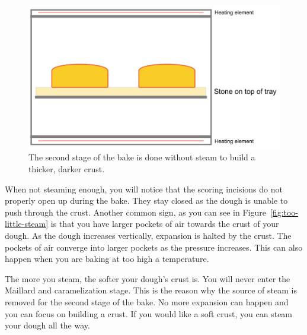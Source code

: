 \begin{figure}[!htb]
  \includegraphics[width=\textwidth]{baking-process-stage-2.jpg}
  \caption[Baking step~2, without steam]{The second stage of the bake is done
      without steam to build a thicker, darker crust.}
\end{figure}

When not steaming enough, you will notice that the scoring
incisions do not properly open up during the bake. They stay
closed as the dough is unable to push through the crust.
Another common sign, as you can see in Figure~\ref{fig:too-little-steam} is
that you have larger pockets of air towards the crust of your dough. As the
dough increases vertically, expansion is halted by the crust. The pockets
of air converge into larger pockets as the pressure increases.
This can also happen when you are baking at too high a temperature.

The more you steam, the softer your dough's crust is. You will never
enter the Maillard and caramelization stage. This
is the reason why the source of steam is removed
for the second stage of the bake. No more expansion can
happen and you can focus on building a crust. If you
would like a soft crust, you can steam your dough all the
way.

